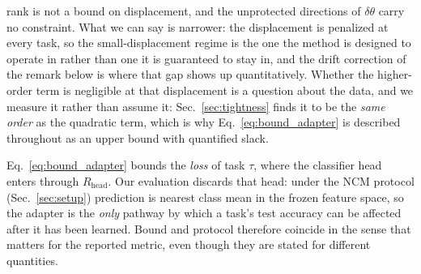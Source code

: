 rank is not a bound on displacement, and the unprotected directions of $\delta\theta$ carry
no constraint. What we can say is narrower: the displacement is penalized at every task, so
the small-displacement regime is the one the method is designed to operate in rather than one
it is guaranteed to stay in, and the drift correction of the remark below is where that gap
shows up quantitatively. Whether the higher-order term is negligible at that displacement is
a question about the data, and we measure it rather than assume it:
Sec.~\ref{sec:tightness} finds it to be the \emph{same order} as the quadratic term, which is
why Eq.~\eqref{eq:bound_adapter} is described throughout as an upper bound with quantified
slack.

Eq.~\eqref{eq:bound_adapter} bounds the \emph{loss} of task $\tau$, where the classifier head
enters through $R_{\text{head}}$. Our evaluation discards that head: under the NCM protocol
(Sec.~\ref{sec:setup}) prediction is nearest class mean in the frozen feature space, so the
adapter is the \emph{only} pathway by which a task's test accuracy can be affected after it
has been learned. Bound and protocol therefore coincide in the sense that matters for the
reported metric, even though they are stated for different quantities.

